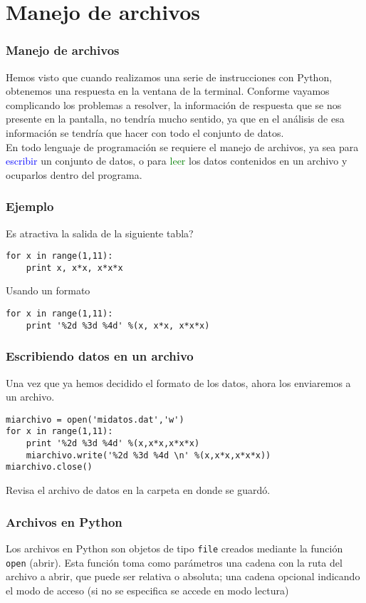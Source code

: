 \section{Manejo de archivos}
\begin{frame}
\frametitle{Manejo de archivos}
Hemos visto que cuando realizamos una serie de instrucciones con Python, obtenemos una respuesta en la ventana de la terminal. Conforme vayamos complicando los problemas a resolver, la informaci\'{o}n de respuesta que se nos presente en la pantalla, no tendr\'{i}a mucho sentido, ya que en el an\'{a}lisis de esa informaci\'{o}n se tendr\'{i}a que hacer con todo el conjunto de datos.
\\
\bigskip
En todo lenguaje de programaci\'{o}n se requiere el manejo de archivos, ya sea para \textcolor{blue}{escribir} un conjunto de datos, o para \textcolor{green}{leer} los datos contenidos en un archivo y ocuparlos dentro del programa.
\end{frame}
\begin{frame}[fragile]
\frametitle{Ejemplo}
Es atractiva la salida de la siguiente tabla?
\begin{exampleblock}{}
\begin{lstlisting}
for x in range(1,11):
    print x, x*x, x*x*x
\end{lstlisting}
\end{exampleblock}
\pause
\begin{exampleblock}{Usando un formato}
\begin{lstlisting}
for x in range(1,11):
    print '%2d %3d %4d' %(x, x*x, x*x*x)
\end{lstlisting}
\end{exampleblock}
\end{frame}
\begin{frame}[fragile]
\frametitle{Escribiendo datos en un archivo}
Una vez que ya hemos decidido el formato de los datos, ahora los enviaremos a un archivo.
\begin{lstlisting}
miarchivo = open('midatos.dat','w')
for x in range(1,11):
    print '%2d %3d %4d' %(x,x*x,x*x*x)
    miarchivo.write('%2d %3d %4d \n' %(x,x*x,x*x*x))
miarchivo.close()
\end{lstlisting}
Revisa el archivo de datos en la carpeta en donde se guard\'{o}.
\end{frame}
\begin{frame}
\frametitle{Archivos en Python}
Los archivos en Python son objetos de tipo \texttt{file} creados mediante la funci\'{o}n \texttt{open} (abrir). Esta funci\'{o}n toma como par\'{a}metros una cadena con la ruta del archivo a abrir, que puede ser relativa o absoluta; una cadena opcional indicando el modo de acceso (si no se especifica se accede en modo lectura)
\end{frame}
